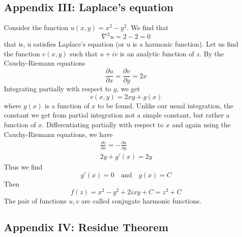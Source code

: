 \documentclass[../../../main.tex]{subfiles}
\begin{document}
\subsection{Appendix III: Laplace’s equation} 
Consider the function $u(x, y) = x^2 - y^2$. We find that
\begin{equation*}
    \nabla^2u=2-2=0
\end{equation*}that is, u satisfies Laplace’s equation (or u is a harmonic function). Let us find the
function $v(x, y)$ such that $u+iv$ is an analytic function of $z$. By the Cauchy-Riemann
equations
\begin{equation*}
    \frac{\partial u}{\partial x}=\frac{\partial v}{\partial y}=2x
\end{equation*}
Integrating partially with respect to $y$, we get
\begin{equation*}
    v(x, y) = 2xy + g(x)
\end{equation*}
where $g(x)$ is a function of $x$ to be found. Unlike our usual integration, the constant we get from partial integration not a simple constant, but rather a function of $x$.  Differentiating partially with respect to $x $ and again using the Cauchy-Riemann equations, we have
\begin{align*}
    \frac{\partial v}{\partial x}=-\frac{\partial u}{\partial y}\\
    2y+g'(x)=2y
\end{align*}
Thus we find
\begin{equation*}
    g'(x)=0\quad \text{and}\quad g(x)=C
\end{equation*}
Then
\begin{equation*}
    f(z)=x^2 - y^2 + 2ixy + C = z^2 + C
\end{equation*}
The pair of functions $u, v$ are called conjugate harmonic functions.

\subsection{Appendix IV: Residue Theorem}
\end{document}
